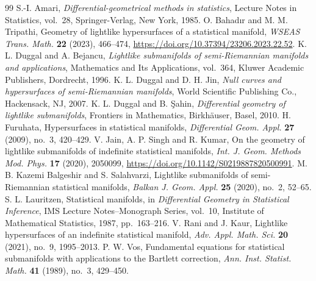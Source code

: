 \documentclass[10pt,a4paper]{amsart}
\begin{document}
\begin{thebibliography}{99}
 S.-I. Amari, \textit{Differential-geometrical methods in statistics}, Lecture Notes in Statistics, vol.~28, Springer-Verlag, New York, 1985.
 O. Bahad{\i}r and M. M. Tripathi, Geometry of lightlike hypersurfaces of a statistical manifold, \textit{WSEAS Trans. Math.} \textbf{22} (2023), 466--474, \url{https://doi.org/10.37394/23206.2023.22.52}.
 K. L. Duggal and A. Bejancu, \textit{Lightlike submanifolds of semi-Riemannian manifolds and applications}, Mathematics and Its Applications, vol.~364, Kluwer Academic Publishers, Dordrecht, 1996.
 K. L. Duggal and D. H. Jin, \textit{Null curves and hypersurfaces of semi-Riemannian manifolds}, World Scientific Publishing Co., Hackensack, NJ, 2007.
 K. L. Duggal and B. \c{S}ahin, \textit{Differential geometry of lightlike submanifolds}, Frontiers in Mathematics, Birkh\"auser, Basel, 2010.
 H. Furuhata, Hypersurfaces in statistical manifolds, \textit{Differential Geom. Appl.} \textbf{27} (2009), no.~3, 420--429.
 V. Jain, A. P. Singh and R. Kumar, On the geometry of lightlike submanifolds of indefinite statistical manifolds, \textit{Int. J. Geom. Methods Mod. Phys.} \textbf{17} (2020), 2050099, \url{https://doi.org/10.1142/S0219887820500991}.
 M. B. Kazemi Balgeshir and S. Salahvarzi, Lightlike submanifolds of semi-Riemannian statistical manifolds, \textit{Balkan J. Geom. Appl.} \textbf{25} (2020), no.~2, 52--65.
 S. L. Lauritzen, Statistical manifolds, in \textit{Differential Geometry in Statistical Inference}, IMS Lecture Notes--Monograph Series, vol.~10, Institute of Mathematical Statistics, 1987, pp.~163--216.
 V. Rani and J. Kaur, Lightlike hypersurfaces of an indefinite statistical manifold, \textit{Adv. Appl. Math. Sci.} \textbf{20} (2021), no.~9, 1995--2013.
 P. W. Vos, Fundamental equations for statistical submanifolds with applications to the Bartlett correction, \textit{Ann. Inst. Statist. Math.} \textbf{41} (1989), no.~3, 429--450.
\end{thebibliography}
\end{document}
